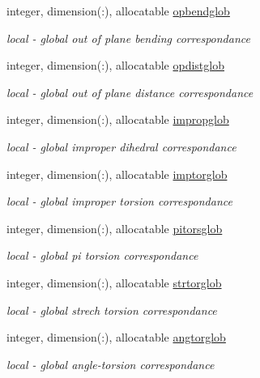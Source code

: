 \begin{DoxyCompactItemize}
integer, dimension(\-:), allocatable \hyperlink{classatmlst_aaf241c6055a6a6dbc04af10bb6a84920}{opbendglob}
\begin{DoxyCompactList}\small\item\em local -\/ global out of plane bending correspondance \end{DoxyCompactList}\item 
integer, dimension(\-:), allocatable \hyperlink{classatmlst_afebb2d4622ffb13863ddb9ab6cbfc88a}{opdistglob}
\begin{DoxyCompactList}\small\item\em local -\/ global out of plane distance correspondance \end{DoxyCompactList}\item 
integer, dimension(\-:), allocatable \hyperlink{classatmlst_a7792a201a52700c101604e529b23a0d1}{impropglob}
\begin{DoxyCompactList}\small\item\em local -\/ global improper dihedral correspondance \end{DoxyCompactList}\item 
integer, dimension(\-:), allocatable \hyperlink{classatmlst_a12c060f14f9efccb685084b1143e93b2}{imptorglob}
\begin{DoxyCompactList}\small\item\em local -\/ global improper torsion correspondance \end{DoxyCompactList}\item 
integer, dimension(\-:), allocatable \hyperlink{classatmlst_acc3c988cbf469a7032d0f8ab6659a5fa}{pitorsglob}
\begin{DoxyCompactList}\small\item\em local -\/ global pi torsion correspondance \end{DoxyCompactList}\item 
integer, dimension(\-:), allocatable \hyperlink{classatmlst_a988c3d46cbd1e50d1777e843505f22ca}{strtorglob}
\begin{DoxyCompactList}\small\item\em local -\/ global strech torsion correspondance \end{DoxyCompactList}\item 
integer, dimension(\-:), allocatable \hyperlink{classatmlst_adb9f9daf04328071793845dfe16c57b6}{angtorglob}
\begin{DoxyCompactList}\small\item\em local -\/ global angle-\/torsion correspondance \end{DoxyCompactList}\item 

\end{DoxyCompactItemize}
